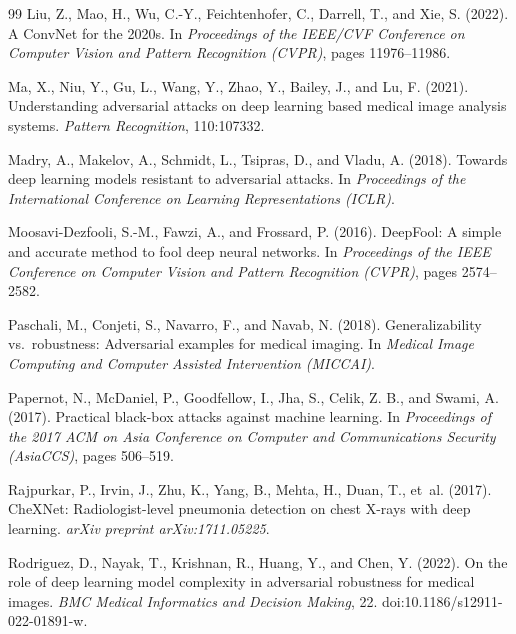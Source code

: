 \documentclass[12pt,a4paper,oneside]{report}
\begin{document}
\begin{thebibliography}{99}
Liu, Z., Mao, H., Wu, C.-Y., Feichtenhofer, C., Darrell, T., and Xie, S. (2022).
\newblock A ConvNet for the 2020s.
\newblock In \emph{Proceedings of the IEEE/CVF Conference on Computer Vision and Pattern Recognition (CVPR)}, pages 11976--11986.

Ma, X., Niu, Y., Gu, L., Wang, Y., Zhao, Y., Bailey, J., and Lu, F. (2021).
\newblock Understanding adversarial attacks on deep learning based medical image analysis systems.
\newblock \emph{Pattern Recognition}, 110:107332.

Madry, A., Makelov, A., Schmidt, L., Tsipras, D., and Vladu, A. (2018).
\newblock Towards deep learning models resistant to adversarial attacks.
\newblock In \emph{Proceedings of the International Conference on Learning Representations (ICLR)}.

Moosavi-Dezfooli, S.-M., Fawzi, A., and Frossard, P. (2016).
\newblock DeepFool: A simple and accurate method to fool deep neural networks.
\newblock In \emph{Proceedings of the IEEE Conference on Computer Vision and Pattern Recognition (CVPR)}, pages 2574--2582.

Paschali, M., Conjeti, S., Navarro, F., and Navab, N. (2018).
\newblock Generalizability vs.\ robustness: Adversarial examples for medical imaging.
\newblock In \emph{Medical Image Computing and Computer Assisted Intervention (MICCAI)}.

Papernot, N., McDaniel, P., Goodfellow, I., Jha, S., Celik, Z. B., and Swami, A. (2017).
\newblock Practical black-box attacks against machine learning.
\newblock In \emph{Proceedings of the 2017 ACM on Asia Conference on Computer and Communications Security (AsiaCCS)}, pages 506--519.

Rajpurkar, P., Irvin, J., Zhu, K., Yang, B., Mehta, H., Duan, T., et~al. (2017).
\newblock CheXNet: Radiologist-level pneumonia detection on chest X-rays with deep learning.
\newblock \emph{arXiv preprint arXiv:1711.05225}.

Rodriguez, D., Nayak, T., Krishnan, R., Huang, Y., and Chen, Y. (2022).
\newblock On the role of deep learning model complexity in adversarial robustness for medical images.
\newblock \emph{BMC Medical Informatics and Decision Making}, 22.
\newblock doi:10.1186/s12911-022-01891-w.


\end{thebibliography}
\end{document}
